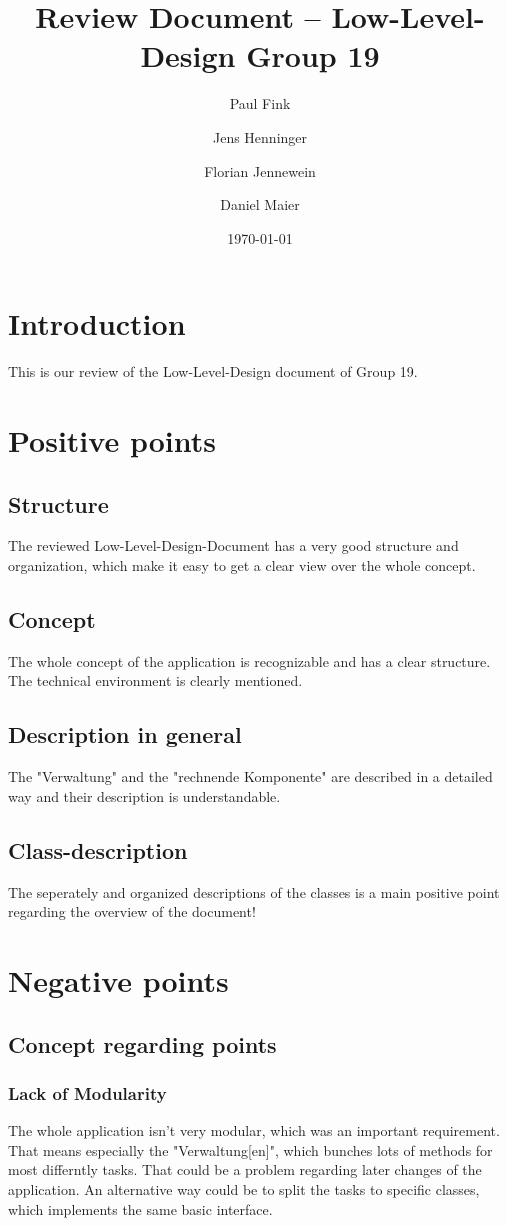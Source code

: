 \documentclass{article}
\title{Review Document -- Low-Level-Design Group 19 }
\author{Paul Fink \and Jens Henninger \and Florian Jennewein \and Daniel Maier}
\date{\today}
\begin{document}
\maketitle

\section{Introduction}
This is our review of the Low-Level-Design document of Group 19. 
\section{Positive points}
\subsection{Structure}
The reviewed Low-Level-Design-Document has a very good structure and organization, which make it easy to get a clear view over the whole concept. 
\subsection{Concept}
The whole concept of the application is recognizable and has a clear structure.
The technical environment is clearly mentioned.
\subsection{Description in general}
The "Verwaltung" and the "rechnende Komponente" are described in a detailed way and their description is understandable.
\subsection{Class-description} 
The seperately and organized descriptions of the classes is a main positive point regarding the overview of the document!
\section{Negative points}
\subsection{Concept regarding points}
\subsubsection{Lack of Modularity}
The whole application isn't very modular, which was an important requirement. That means especially the "Verwaltung[en]", which bunches lots of methods for most differntly tasks. That could be a problem regarding later changes of the application. An alternative way could be to split the tasks to specific classes, which implements the same basic interface.
\end{document}
